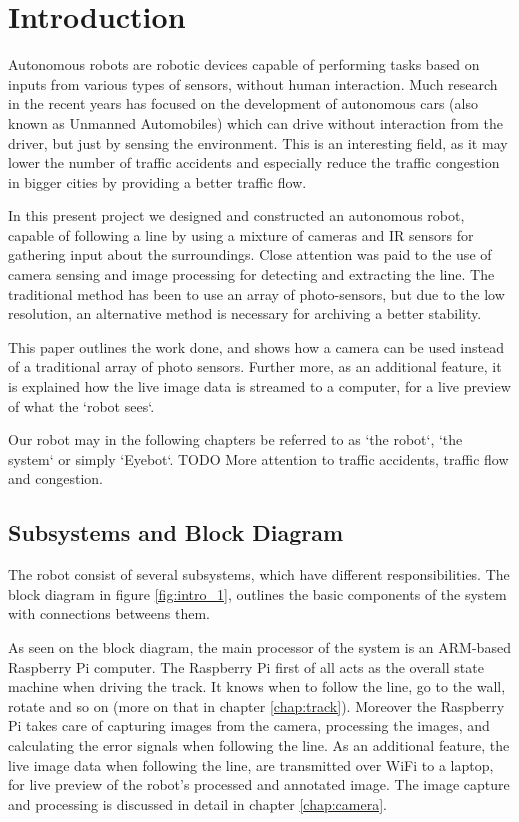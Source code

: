 \chapter{Introduction}

Autonomous robots are robotic devices capable of performing tasks based on inputs from various types of sensors, without human interaction. Much research in the recent years has focused on the development of autonomous cars (also known as Unmanned Automobiles) which can drive without interaction from the driver, but just by sensing the environment. This is an interesting field, as it may lower the number of traffic accidents and especially reduce the traffic congestion in bigger cities by providing a better traffic flow.

In this present project we designed and constructed an autonomous robot, capable of following a line by using a mixture of cameras and IR sensors for gathering input about the surroundings. Close attention was paid to the use of camera sensing and image processing for detecting and extracting the line. The traditional method has been to use an array of photo-sensors, but due to the low resolution, an alternative method is necessary for archiving a better stability.

This paper outlines the work done, and shows how a camera can be used instead of a traditional array of photo sensors. Further more, as an additional feature, it is explained how the live image data is streamed to a computer, for a live preview of what the `robot sees`.

Our robot may in the following chapters be referred to as `the robot`, `the system` or simply `Eyebot`.
TODO More attention to traffic accidents, traffic flow and congestion.

\section{Subsystems and Block Diagram}

The robot consist of several subsystems, which have different responsibilities. The block diagram in figure \ref{fig:intro_1}, outlines the basic components of the system with connections betweens them. 

As seen on the block diagram, the main processor of the system is an ARM-based Raspberry Pi computer. The Raspberry Pi first of all acts as the overall state machine when driving the track. It knows when to follow the line, go to the wall, rotate and so on (more on that in chapter \ref{chap:track}). Moreover the Raspberry Pi takes care of capturing images from the camera, processing the images, and calculating the error signals when following the line. As an additional feature, the live image data when following the line, are transmitted over WiFi to a laptop, for live preview of the robot's processed and annotated image. The image capture and processing is discussed in detail in chapter \ref{chap:camera}.

